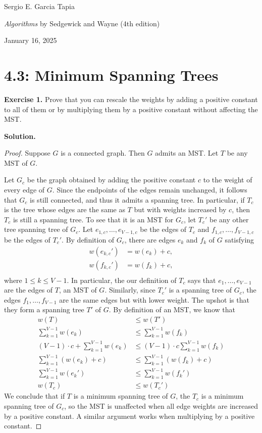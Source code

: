 \documentclass[12pt, a4paper]{article}
\newenvironment{ex}[2][Exercise]
{\par\medskip\noindent \textbf{#1 #2.}}
{\medskip}
\newenvironment{sol}[1][Solution]
{\par\medskip\noindent \textbf{#1.} }
{\medskip}
\begin{document}
	\noindent Sergio E. Garcia Tapia \hfill
	
	\noindent \emph{Algorithms} by Sedgewick and Wayne (4th edition) \cite{sedgewick_wayne}\hfill
	
	\noindent January 16, 2025\hfill 
	\section*{4.3: Minimum Spanning Trees}
	\begin{ex}{1}
		Prove that you can rescale the weights by adding a positive constant to all of them
		or by multiplying them by a positive constant without affecting the MST.
	\end{ex}
	\begin{sol}
		\begin{proof}
			Suppose $G$ is a connected graph. Then $G$ admits an  MST. Let $T$ be
			any MST of $G$.
			
			Let $G_c$ be the graph obtained by adding the positive constant $c$
			to the weight of every edge of $G$. Since the endpoints of the
			edges remain unchanged, it follows that $G_c$ is still connected,
			and thus it admits a spanning tree. In particular, if $T_c$
			is the tree whose edges are the same as $T$ but with weights
			increased by $c$, then $T_c$ is still a spanning tree. To see that it
			is an MST for $G_c$, let $T_c'$ be any other tree spanning tree
			of $G_c$. Let $e_{1,c},\ldots,e_{V-1,c}$ be the edges of $T_c$
			and $f_{1,c},\ldots,f_{V-1,c}$ be the edges of $T_c'$. By definition
			of $G_c$, there are edges $e_k$ and $f_k$ of $G$ satisfying
			\begin{align*}
				w(e_{k,c}')&=w(e_{k}) + c,\\
				w(f_{k,c}')&=w(f_{k}) + c,\\
			\end{align*}
			where $1\leq k\leq V-1$. In particular, the our definition of $T_c$ says that
			$e_1,\ldots,e_{V-1}$ are the edges of $T$, an MST of $G$. Similarly,
			since $T_c'$ is a spanning tree of $G_c$, the edges $f_1,\ldots,f_{V-1}$
			are the same edges but with lower weight. The upshot is that they form
			a spanning tree $T'$ of $G$. By definition of an MST, we know that
			\begin{align*}
				w(T)&\leq w(T')\\
				\sum_{k=1}^{V-1}w(e_k)& \leq \sum_{k=1}^{V-1}w(f_k)\\
				(V-1)\cdot c + \sum_{k=1}^{V-1}w(e_k)& \leq (V-1)\cdot c\sum_{k=1}^{V-1}w(f_k)\\
				\sum_{k=1}^{V-1}(w(e_k) + c)& \leq \sum_{k=1}^{V-1}(w(f_k) + c)\\
				\sum_{k=1}^{V-1}w(e_k')& \leq \sum_{k=1}^{V-1}w(f_k')\\
				w(T_c)&\leq w(T_c')
			\end{align*}
			We conclude that if $T$ is a minimum spanning tree of $G$, the $T_c$ is
			a minimum spanning tree of $G_c$, so the MST is unaffected when all
			edge weights are increased by a positive constant. A similar argument
			works when multiplying by a positive constant.
		\end{proof}
	\end{sol}
\end{document}
